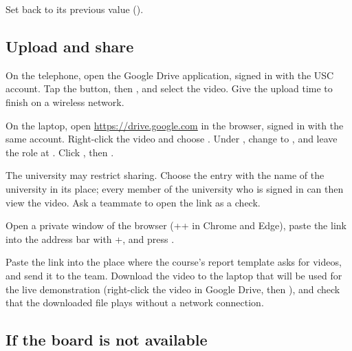 Set  back to its previous value (\then{}\then{}).

\subsection{Upload and share}

On the telephone, open the Google Drive application, signed in with the USC account. Tap the
\ui{+} button, then , and select the video. Give the upload time to finish on a
wireless network.

\label{st:share}
On the laptop, open \url{https://drive.google.com} in the browser, signed in with the same
account. Right-click the video and choose \then{}. Under , change  to , and leave the role at
. Click , then .

\begin{iffail}
The university may restrict sharing. Choose the entry with the name of the university in its
place; every member of the university who is signed in can then view the video. Ask a teammate
to open the link as a check.
\end{iffail}

Open a private window of the browser (++ in Chrome and Edge), paste
the link into the address bar with +, and press .

Paste the link into the place where the course's report template asks for videos, and send it
to the team. Download the video to the laptop that will be used for the live demonstration
(right-click the video in Google Drive, then ), and check that the downloaded
file plays without a network connection.

\subsection{If the board is not available}
\label{sec:noboard}

